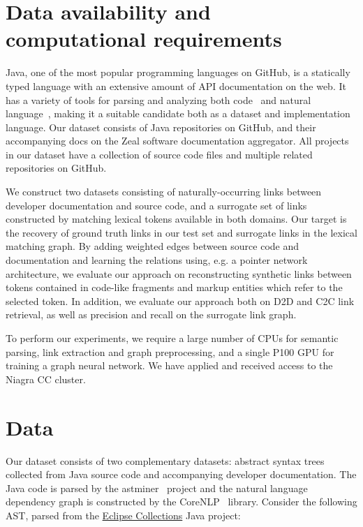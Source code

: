 \documentclass{article}
\begin{document}
\section{Data availability and computational requirements}

Java, one of the most popular programming languages on GitHub, is a statically typed language with an extensive amount of API documentation on the web. It has a variety of tools for parsing and analyzing both code~\citep{kovalenko2019pathminer} and natural language~\citep{manning2014stanford, grella2018non}, making it a suitable candidate both as a dataset and implementation language. Our dataset consists of Java repositories on GitHub, and their accompanying docs on the Zeal software documentation aggregator. All projects in our dataset have a collection of source code files and multiple related repositories on GitHub.

We construct two datasets consisting of naturally-occurring links between developer documentation and source code, and a surrogate set of links constructed by matching lexical tokens available in both domains. Our target is the recovery of ground truth links in our test set and surrogate links in the lexical matching graph. By adding weighted edges between source code and documentation and learning the relations using, e.g. a pointer network architecture, we evaluate our approach on reconstructing synthetic links between tokens contained in code-like fragments and markup entities which refer to the selected token. In addition, we evaluate our approach both on D2D and C2C link retrieval, as well as precision and recall on the surrogate link graph.

To perform our experiments, we require a large number of CPUs for semantic parsing, link extraction and graph preprocessing, and a single P100 GPU for training a graph neural network. We have applied and received access to the Niagra CC cluster.

\section{Data}

Our dataset consists of two complementary datasets: abstract syntax trees collected from Java source code and accompanying developer documentation. The Java code is parsed by the astminer~\citep{kovalenko2019pathminer} project and the natural language dependency graph is constructed by the CoreNLP~\citep{manning2014stanford} library. Consider the following AST, parsed from the \href{https://www.eclipse.org/collections/}{Eclipse Collections} Java project:
\end{document}

